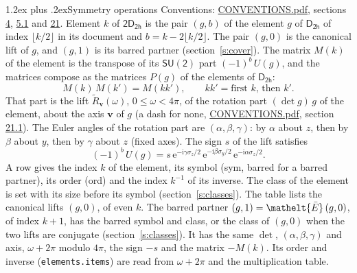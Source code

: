 \documentclass[10pt,a4paper]{article}
\makeatletter
\renewcommand\section{\@startsection{section}{1}{\z@}{-3ex plus -1ex minus -.2ex}%
  {1.2ex plus .2ex}{\normalfont\large\sffamily\bfseries\color{parttitle}}}
\numberwithin{equation}{section}
\newcommand{\eltfont}[1]{{\let\sigma\eltsigma\mathelt{#1}}}
\newcommand{\grp}[1]{\mathsf{#1}}
\newcommand{\elt}[1]{\eltfont{#1}}
\newcommand{\vv}{\mathbf{v}}
\newcommand{\iunit}{\mathrm{i}}
\newcommand{\expe}{\mathrm{e}}
\newcommand{\barred}[1]{\bar{#1}}
\newcommand{\lift}[1]{\tilde{#1}}
\newcommand{\pauli}[1]{\sigma_{#1}}
\makeatother
\begin{document}
\section{Symmetry operations}\label{s:elements}
Conventions: \href{../../CONVENTIONS.pdf}{CONVENTIONS.pdf}, sections \href{../../../rotation/CONVENTIONS.pdf\#conv.4}{4}, \href{../../../rotation/CONVENTIONS.pdf\#conv.5.1}{5.1} and \href{../../CONVENTIONS.pdf\#conv.21}{21}.
\leavevmode\label{n:index.element}\label{n:element.g}Element $k$ of $\grp{2D_{2h}}$ is the pair $(g, b)$ of the element $g$ of \href{../../../rotation/data/pdf/D2h.pdf}{$\grp{D_{2h}}$} of index $\lfloor k/2\rfloor$ in its document and $b = k - 2\lfloor k/2\rfloor$. The pair $(g, 0)$ is the canonical lift of $g$, and $(g, 1)$ is its barred partner (section~\ref{s:cover}). \label{n:matrix.element.pin}\label{n:matrix.element}The matrix $M(k)$ of the element is the transpose of its $\grp{SU(2)}$ part $(-1)^{b}\,U(g)$, and the matrices compose as the matrices $P(g)$ of the elements of $\grp{D_{2h}}$:
\begin{equation}\label{e:mprod}M(k)\,M(k') = M(kk'),\qquad kk' = \text{first } k\text{, then } k'.\end{equation}
\leavevmode\label{n:angle.omega}\label{n:vector.axis}\label{n:vector.pole}That part is the lift $\lift{R}_{\vv}(\omega)$, $0 \le \omega < 4\pi$, of the rotation part $(\det g)\,g$ of the element, about the axis $\vv$ of $g$ (a dash for none, \href{../../CONVENTIONS.pdf}{CONVENTIONS.pdf}, section \href{../../CONVENTIONS.pdf\#conv.21.1}{21.1}). \label{n:angle.euler.alpha}\label{n:angle.euler.beta}\label{n:angle.euler.gamma}\label{n:vector.coordinates}The Euler angles of the rotation part are $(\alpha,\beta,\gamma)$: by $\alpha$ about $z$, then by $\beta$ about $y$, then by $\gamma$ about $z$ (fixed axes). \label{n:local.euler.sign}The sign $s$ of the lift satisfies
\begin{equation}\label{e:euler}(-1)^{b}\,U(g) = s\,\expe^{-\iunit\gamma\pauli{z}/2}\,\expe^{-\iunit\beta\pauli{y}/2}\,\expe^{-\iunit\alpha\pauli{z}/2}.\end{equation}
\leavevmode\label{n:index.element.inverse}\label{n:head.sym}\label{n:head.ord}A row gives the index $k$ of the element, its symbol (sym, barred for a barred partner), its order (ord) and the index $k^{-1}$ of its inverse. \label{n:head.class}The class of the element is set with its size before its symbol (section~\ref{s:classes}).
The table lists the canonical lifts $(g, 0)$, of even $k$. The barred partner $(g, 1) = \elt{\barred{E}}\,(g, 0)$, of index $k + 1$, has the barred symbol and class, or the class of $(g, 0)$ when the two lifts are conjugate (section~\ref{s:classes}). It has the same $\det$, $(\alpha,\beta,\gamma)$ and axis, $\omega + 2\pi$ modulo $4\pi$, the sign $-s$ and the matrix $-M(k)$. Its order and inverse (\texttt{elements.items}) are read from $\omega + 2\pi$ and the multiplication table.
\end{document}
